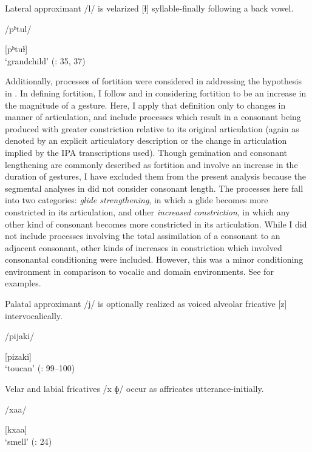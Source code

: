 Lateral approximant /l/ is velarized [ɫ] syllable-finally following a back vowel.

/pʰtul/

[pʰtuɫ]\\
\glt ‘grandchild’
(\citealt{Haspelmath1993}: 35, 37)
\z

  Additionally, processes of fortition were considered in addressing the hypothesis in . In defining fortition, I follow \citet{Bybee2015b} and \citet{BybeeEasterday2019} in considering fortition to be an increase in the magnitude of a gesture. Here, I apply that definition only to changes in manner of articulation, and include processes which result in a consonant being produced with greater constriction relative to its original articulation (again as denoted by an explicit articulatory description or the change in articulation implied by the IPA transcriptions used). Though gemination and consonant lengthening are commonly described as fortition and involve an increase in the duration of gestures, I have excluded them from the present analysis because the segmental analyses in  did not consider consonant length. The processes here fall into two categories: \textit{glide strengthening}, in which a glide becomes more constricted in its articulation, and other \textit{increased constriction}, in which any other kind of consonant becomes more constricted in its articulation. While I did not include processes involving the total assimilation of a consonant to an adjacent consonant, other kinds of increases in constriction which involved consonantal conditioning were included. However, this was a minor conditioning environment in comparison to vocalic and domain environments. See  for examples.

\ea\label{ex:7.9}

Palatal approximant /j/ is optionally realized as voiced alveolar fricative [z] intervocalically.

/pijaki/

[pizaki]\\
\glt ‘toucan’
(\citealt{VallejosYopán2010}: 99--100)
\z

\ea\label{ex:7.10}

Velar and labial fricatives /x ɸ/ occur as affricates utterance-initially.

/xaa/

[kxaa]\\
\glt ‘smell’
(\citealt{FranklinFranklin1978}: 24)
\z

